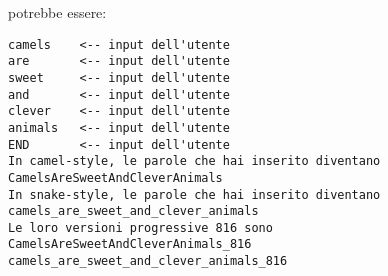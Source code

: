 \documentclass{article}[10pt]
\begin{document}
\noindent
potrebbe essere:

{\small
\begin{verbatim}
camels    <-- input dell'utente
are       <-- input dell'utente
sweet     <-- input dell'utente
and       <-- input dell'utente
clever    <-- input dell'utente
animals   <-- input dell'utente
END       <-- input dell'utente
In camel-style, le parole che hai inserito diventano
CamelsAreSweetAndCleverAnimals
In snake-style, le parole che hai inserito diventano
camels_are_sweet_and_clever_animals
Le loro versioni progressive 816 sono
CamelsAreSweetAndCleverAnimals_816
camels_are_sweet_and_clever_animals_816
\end{verbatim}}
\end{document}
